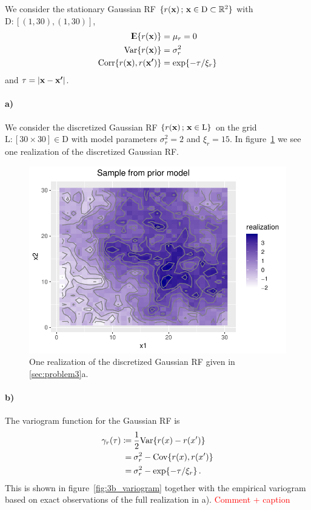 We consider the stationary Gaussian RF $\{r(\boldsymbol{\mathbf{x}}) \,;\, \boldsymbol{\mathbf{x}} \in \mathrm{D} \subset \mathbb{R}^2\}$ with $\mathrm{D} \colon [(1,30), (1,30)]$,
%
\begin{align*}
    {\rm I\kern-.3em E}\{r(\boldsymbol{\mathbf{x}})\} &= \mu_r = 0 \\
    \mathrm{Var}\{r(\boldsymbol{\mathbf{x}})\} &= \sigma_r^2 \\
    \mathrm{Corr}\{r(\boldsymbol{\mathbf{x}}), r(\boldsymbol{\mathbf{x'}})\} &= \exp\{-\tau/\xi_r\}
\end{align*}
%
and $\tau = |\boldsymbol{\mathbf{x}} - \boldsymbol{\mathbf{x'}}|$.

\paragraph{a)}
We consider the discretized Gaussian RF $\{r(\boldsymbol{\mathbf{x}}) \,;\, \boldsymbol{\mathbf{x}} \in \mathrm{L}\}$ on the grid $\mathrm{L} \colon [30 \times 30] \in \mathrm{D}$ with model parameters $\sigma_r^2=2$ and $\xi_r=15$. In figure~\ref{fig:3a_realization} we see one realization of the discretized Gaussian RF.

\begin{figure}
    \centering
    \includegraphics[scale=0.95]{figures/3a_realization.pdf}
    \caption{One realization of the discretized Gaussian RF given in \ref{sec:problem3}a.}
    \label{fig:3a_realization}
\end{figure}

\paragraph{b)}
The variogram function for the Gaussian RF is
%
\begin{align*}
\gamma_r(\tau)
\coloneqq&\: \frac{1}{2} \mathrm{Var} \{ r(x) - r(x') \} \\
=&\: \sigma_r^2 - \mathrm{Cov}\{r(x), r(x')\} \\
=&\: \sigma_r^2 - \exp\{-\tau/\xi_r\} \, .
\end{align*}
%
This is shown in figure~\ref{fig:3b_variogram} together with the empirical variogram based on exact observations of the full realization in a). \textcolor{red}{Comment + caption}  

